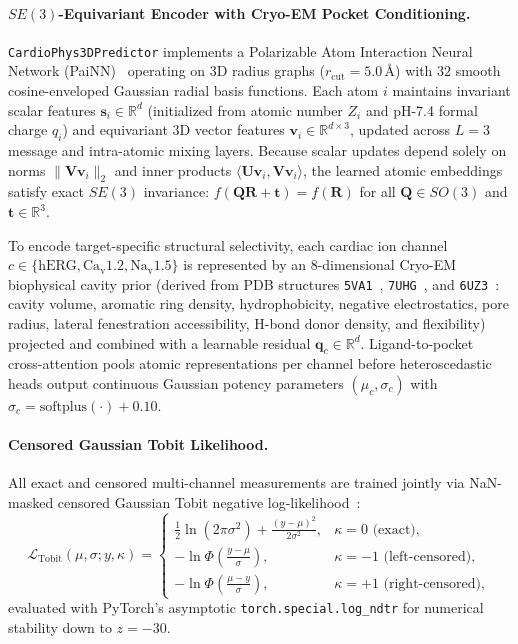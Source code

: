\documentclass[10pt,twocolumn,letterpaper]{article}
\begin{document}
\paragraph{$SE(3)$-Equivariant Encoder with Cryo-EM Pocket Conditioning.}
\texttt{CardioPhys3DPredictor} implements a Polarizable Atom Interaction Neural Network (PaiNN)~\cite{schutt2021equivariant} operating on 3D radius graphs ($r_{\mathrm{cut}} = 5.0\,\text{\AA}$) with $32$ smooth cosine-enveloped Gaussian radial basis functions. Each atom $i$ maintains invariant scalar features $\mathbf{s}_i \in \mathbb{R}^d$ (initialized from atomic number $Z_i$ and pH-7.4 formal charge $q_i$) and equivariant 3D vector features $\mathbf{v}_i \in \mathbb{R}^{d \times 3}$, updated across $L=3$ message and intra-atomic mixing layers. Because scalar updates depend solely on norms $\|\mathbf{V}\mathbf{v}_i\|_2$ and inner products $\langle \mathbf{U}\mathbf{v}_i, \mathbf{V}\mathbf{v}_i\rangle$, the learned atomic embeddings satisfy exact $SE(3)$ invariance: $f(\mathbf{Q}\mathbf{R} + \mathbf{t}) = f(\mathbf{R})$ for all $\mathbf{Q} \in SO(3)$ and $\mathbf{t} \in \mathbb{R}^3$.

To encode target-specific structural selectivity, each cardiac ion channel $c \in \{\text{hERG}, \text{Ca}_\text{v}\text{1.2}, \text{Na}_\text{v}\text{1.5}\}$ is represented by an 8-dimensional Cryo-EM biophysical cavity prior (derived from PDB structures \texttt{5VA1}~\cite{wang2017cryoem}, \texttt{7UHG}~\cite{gao2022structural}, and \texttt{6UZ3}~\cite{jiang2020structure}: cavity volume, aromatic ring density, hydrophobicity, negative electrostatics, pore radius, lateral fenestration accessibility, H-bond donor density, and flexibility) projected and combined with a learnable residual $\mathbf{q}_c \in \mathbb{R}^d$. Ligand-to-pocket cross-attention pools atomic representations per channel before heteroscedastic heads output continuous Gaussian potency parameters $(\mu_c, \sigma_c)$ with $\sigma_c = \mathrm{softplus}(\cdot) + 0.10$.

\paragraph{Censored Gaussian Tobit Likelihood.}
All exact and censored multi-channel measurements are trained jointly via NaN-masked censored Gaussian Tobit negative log-likelihood~\cite{tobin1958estimation}:
\begin{equation}
  \mathcal{L}_{\mathrm{Tobit}}(\mu, \sigma; y, \kappa) =
  \begin{cases}
    \frac{1}{2}\ln(2\pi\sigma^2) + \frac{(y - \mu)^2}{2\sigma^2}, & \kappa = 0 \text{ (exact)}, \\[4pt]
    -\ln \Phi\!\left(\frac{y - \mu}{\sigma}\right), & \kappa = -1 \text{ (left-censored)}, \\[4pt]
    -\ln \Phi\!\left(\frac{\mu - y}{\sigma}\right), & \kappa = +1 \text{ (right-censored)},
  \end{cases}
  \label{eq:tobit}
\end{equation}
evaluated with PyTorch's asymptotic \texttt{torch.special.log\_ndtr} for numerical stability down to $z = -30$.
\end{document}
